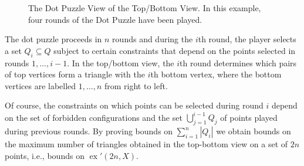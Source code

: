 \documentclass{patmorin}
\DeclareMathOperator{\ex}{ex}
\begin{document}
\begin{figure}
   \caption{The Dot Puzzle View of the Top/Bottom View. In this example,
     four rounds of the Dot Puzzle have been played.}
\end{figure}

The dot puzzle proceeds in $n$ rounds and during the $i$th round, the
player selects a set $Q_i\subseteq Q$ subject to certain constraints
that depend on the points selected in rounds $1,\ldots,i-1$.  In the
top/bottom view, the $i$th round determines which pairs of top vertices
form a triangle with the $i$th bottom vertex, where the bottom
vertices are labelled $1,\ldots,n$ from right to left.  

Of course, the constraints on which points can be selected during
round $i$ depend on the set of forbidden configurations and the set
$\bigcup_{j=1}^{i-1} Q_j$ of points played during previous rounds.
By proving bounds on $\sum_{i=1}^n |Q_i|$ we obtain bounds on the maximum
number of triangles obtained in the top-bottom view on a set of $2n$
points, i.e., bounds on $\ex'(2n, X)$.
\end{document}
